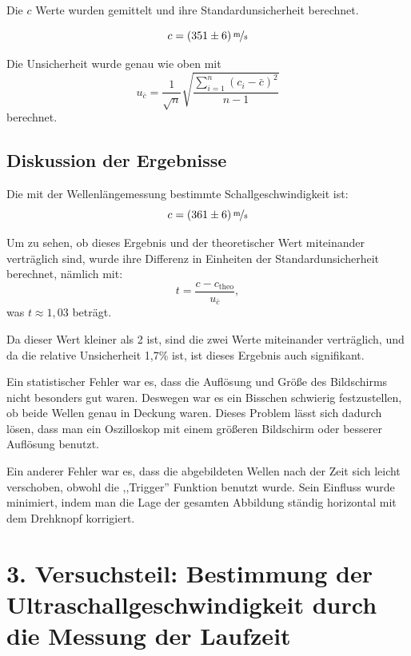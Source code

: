 \documentclass[11pt,a4paper]{article}
\begin{document}
Die $c$ Werte wurden gemittelt und ihre Standardunsicherheit berechnet. 

$$ c = (351 \pm 6)\,\nicefrac{\mathrm{m}}{\mathrm{s}}$$

Die Unsicherheit wurde genau wie oben mit
$$u_{\bar{c}} = \frac{1}{\sqrt{n}} \sqrt{\frac{\sum_{i=1}^{n}(c_i-\bar{c})^2}{n-1}}$$
berechnet. 




\subsection{Diskussion der Ergebnisse}


Die mit der Wellenlängemessung bestimmte Schallgeschwindigkeit ist:
$$ c = (361 \pm 6)\,\nicefrac{\mathrm{m}}{\mathrm{s}}$$

Um zu sehen, ob dieses Ergebnis und der theoretischer Wert miteinander verträglich sind, wurde ihre Differenz in Einheiten der Standardunsicherheit berechnet, nämlich mit:
$$ t = \frac{c - c_\textrm{theo}}{u_{\bar{c}}}, $$
 was $t \approx 1,03 $ beträgt. 
	
Da dieser Wert kleiner als 2 ist, sind die zwei Werte miteinander verträglich, und da die relative Unsicherheit 1,7\% ist, ist dieses Ergebnis auch signifikant. 

Ein statistischer Fehler war es, dass die Auflösung und Größe des Bildschirms nicht besonders gut waren. Deswegen war es ein Bisschen schwierig festzustellen, ob beide Wellen genau in Deckung waren. Dieses Problem lässt sich dadurch lösen, dass man ein Oszilloskop mit einem größeren Bildschirm oder besserer Auflösung benutzt. 

Ein anderer Fehler war es, dass die abgebildeten Wellen nach der Zeit sich leicht verschoben, obwohl die ,,Trigger'' Funktion benutzt wurde. Sein Einfluss wurde minimiert, indem man die Lage der gesamten Abbildung ständig horizontal mit dem Drehknopf korrigiert. 





\section{3. Versuchsteil: Bestimmung der Ultraschallgeschwindigkeit durch die Messung der Laufzeit}
\end{document}
